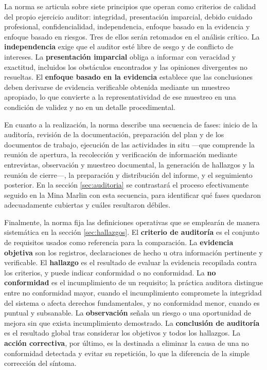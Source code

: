 La norma se articula sobre siete principios que operan como criterios de calidad
del propio ejercicio auditor: integridad, presentación imparcial, debido cuidado
profesional, confidencialidad, independencia, enfoque basado en la evidencia y
enfoque basado en riesgos. Tres de ellos serán retomados en el análisis crítico.
La \textbf{independencia} exige que el auditor esté libre de sesgo y de conflicto
de intereses. La \textbf{presentación imparcial} obliga a informar con veracidad y
exactitud, incluidos los obstáculos encontrados y las opiniones divergentes no
resueltas. El \textbf{enfoque basado en la evidencia} establece que las
conclusiones deben derivarse de evidencia verificable obtenida mediante un
muestreo apropiado, lo que convierte a la representatividad de ese muestreo en una
condición de validez y no en un detalle procedimental.

En cuanto a la realización, la norma describe una secuencia de fases: inicio de la
auditoría, revisión de la documentación, preparación del plan y de los documentos
de trabajo, ejecución de las actividades in situ —que comprende la reunión de
apertura, la recolección y verificación de información mediante entrevistas,
observación y muestreo documental, la generación de hallazgos y la reunión de
cierre—, la preparación y distribución del informe, y el seguimiento posterior. En
la sección \ref{sec:auditoria} se contrastará el proceso efectivamente seguido en
la Mina Marlin con esta secuencia, para identificar qué fases quedaron
adecuadamente cubiertas y cuáles resultaron débiles.

Finalmente, la norma fija las definiciones operativas que se emplearán de manera
sistemática en la sección \ref{sec:hallazgos}. El \textbf{criterio de auditoría}
es el conjunto de requisitos usados como referencia para la comparación. La
\textbf{evidencia objetiva} son los registros, declaraciones de hecho u otra
información pertinente y verificable. El \textbf{hallazgo} es el resultado de
evaluar la evidencia recopilada contra los criterios, y puede indicar conformidad
o no conformidad. La \textbf{no conformidad} es el incumplimiento de un requisito;
la práctica auditora distingue entre no conformidad mayor, cuando el
incumplimiento compromete la integridad del sistema o afecta derechos
fundamentales, y no conformidad menor, cuando es puntual y subsanable. La
\textbf{observación} señala un riesgo o una oportunidad de mejora sin que exista
incumplimiento demostrado. La \textbf{conclusión de auditoría} es el resultado
global tras considerar los objetivos y todos los hallazgos. La \textbf{acción
correctiva}, por último, es la destinada a eliminar la causa de una no conformidad
detectada y evitar su repetición, lo que la diferencia de la simple corrección del
síntoma.

